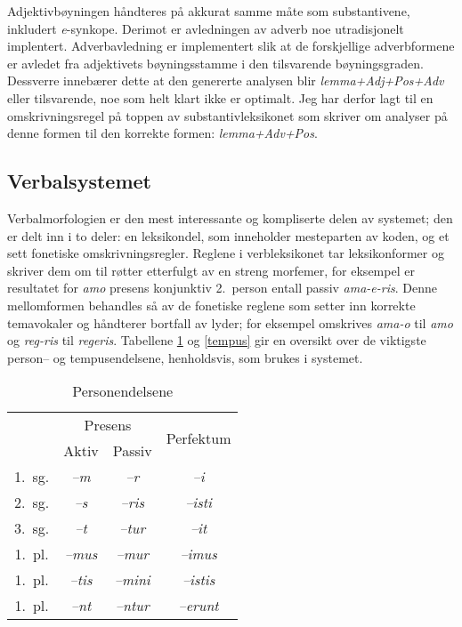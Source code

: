 \documentclass{article}
\let\form\emph
\let\w\emph
\begin{document}
Adjektivb\o{}yningen h\aa{}ndteres p\aa{} akkurat samme m\aa{}te som
substantivene, inkludert \w{e}-synkope. Derimot er avledningen av adverb noe
utradisjonelt implentert. Adverbavledning er implementert slik at de
forskjellige adverbformene er avledet fra adjektivets b\o{}yningsstamme i den
tilsvarende b\o{}yningsgraden. Dessverre inneb\ae{}rer dette at den genererte
analysen blir \form{lemma+Adj+Pos+Adv} eller tilsvarende, noe som helt klart
ikke er optimalt. Jeg har derfor lagt til en omskrivningsregel p\aa{} toppen
av substantivleksikonet som skriver om analyser p\aa{} denne formen til den
korrekte formen: \form{lemma+Adv+Pos}.

\subsection{Verbalsystemet}
\label{konjugasjon}
Verbalmorfologien er den mest interessante og kompliserte delen av systemet;
den er delt inn i to deler: en leksikondel, som inneholder mesteparten av
koden, og et sett fonetiske omskrivningsregler. Reglene i verbleksikonet tar
leksikonformer og skriver dem om til r\o{}tter etterfulgt av en streng
morfemer, for eksempel er resultatet for \w{amo} presens konjunktiv 2.~person
entall passiv \w{ama-e-ris}. Denne mellomformen behandles s\aa{} av de
fonetiske reglene som setter inn korrekte temavokaler og h\aa{}ndterer
bortfall av lyder; for eksempel omskrives \w{ama-o} til \w{amo} og \w{reg-ris}
til \w{regeris}. Tabellene \ref{endelser} og \ref{tempus} gir en oversikt over
de viktigste person-- og tempusendelsene, henholdsvis, som brukes i systemet.

\begin{table}
\begin{center}
\begin{tabular}{|c|c|c|c|}
    \hline
       & \multicolumn{2}{c|}{Presens} & \multirow{2}{*}{Perfektum} \\ \cline{2-3}
       & Aktiv & Passiv & \\
    \hline
1.~sg. & \w{--m}   & \w{--r}    & \w{--i}     \\
2.~sg. & \w{--s}   & \w{--ris}  & \w{--isti}  \\
3.~sg. & \w{--t}   & \w{--tur}  & \w{--it}    \\
1.~pl. & \w{--mus} & \w{--mur}  & \w{--imus}  \\
1.~pl. & \w{--tis} & \w{--mini} & \w{--istis} \\
1.~pl. & \w{--nt}  & \w{--ntur} & \w{--erunt} \\
    \hline
\end{tabular}
\caption{Personendelsene}
\label{endelser}
\end{center}
\end{table}
\end{document}
